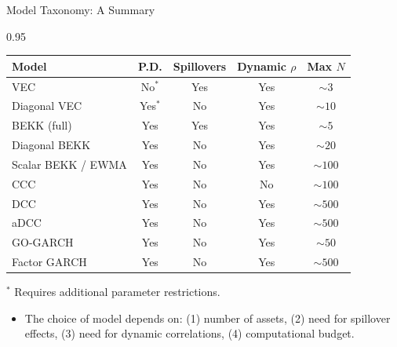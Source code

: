 \documentclass[9pt, aspectratio=169, t]{beamer}
\begin{document}
\begin{frame}{Model Taxonomy: A Summary}
    \begin{cminipage}{0.95\textwidth}
    {\scriptsize
    \begin{center}
    \begin{tabular}{lcccc}
        \hline
        \textbf{Model} & \textbf{P.D.} & \textbf{Spillovers} & \textbf{Dynamic $\rho$} & \textbf{Max $N$} \\
        \hline
        VEC & No$^*$ & Yes & Yes & $\sim 3$ \\
        Diagonal VEC & Yes$^*$ & No & Yes & $\sim 10$ \\
        BEKK (full) & Yes & Yes & Yes & $\sim 5$ \\
        Diagonal BEKK & Yes & No & Yes & $\sim 20$ \\
        Scalar BEKK / EWMA & Yes & No & Yes & $\sim 100$ \\
        CCC & Yes & No & No & $\sim 100$ \\
        DCC & Yes & No & Yes & $\sim 500$ \\
        aDCC & Yes & No & Yes & $\sim 500$ \\
        GO-GARCH & Yes & No & Yes & $\sim 50$ \\
        Factor GARCH & Yes & No & Yes & $\sim 500$ \\
        \hline
    \end{tabular}
    \end{center}
    \vspace{0.1cm}
    $^*$ Requires additional parameter restrictions.
    }
    \vspace{0.1cm}
    \begin{alertblock}{}
        {\footnotesize
        \begin{itemize}\setlength{\itemsep}{0pt}
            \item The choice of model depends on: (1) number of assets, (2) need for spillover effects, (3) need for dynamic correlations, (4) computational budget.
        \end{itemize}
        }
    \end{alertblock}
    \end{cminipage}
\end{frame}
\end{document}
